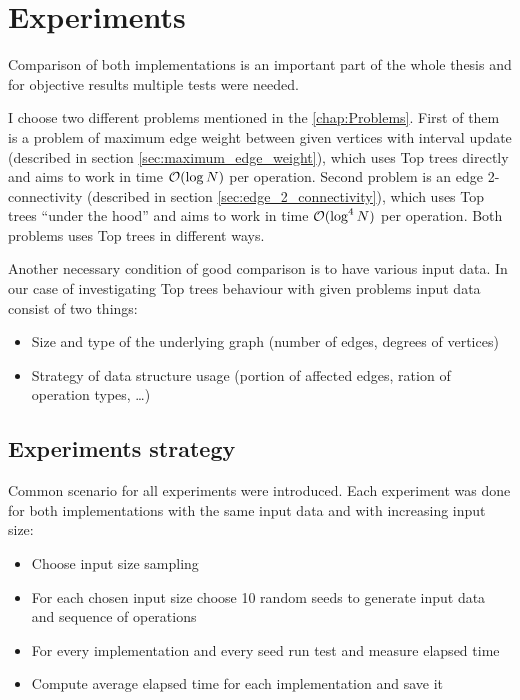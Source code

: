 \chapter{Experiments}
\label{chap:Experiments}

Comparison of both implementations is an important part of the whole thesis
and for objective results multiple tests were needed.

I choose two different problems mentioned in the \cref{chap:Problems}.
First of them is a problem of maximum edge weight between given vertices with
interval update (described in section \ref{sec:maximum_edge_weight}), which uses
Top trees directly and aims to work in time ${\cal O}(\log N)$ per operation. Second
problem is an edge 2-connectivity (described in section \ref{sec:edge_2_connectivity}),
which uses Top trees ``under the hood'' and aims to work in time ${\cal O}(\log^4 N)$
per operation. Both problems uses Top trees in different ways.

Another necessary condition of good comparison is to have various input data. In
our case of investigating Top trees behaviour with given problems input data
consist of two things:
\begin{itemize}
\item Size and type of the underlying graph (number of edges, degrees of vertices)
\item Strategy of data structure usage (portion of affected edges, ration of
operation types, \dots)
\end{itemize}

\section{Experiments strategy}

Common scenario for all experiments were introduced. Each experiment was done
for both implementations with the same input data and with increasing input
size:

\begin{itemize}
\item Choose input size sampling
\item For each chosen input size choose 10 random seeds to generate input data
and sequence of operations
\item For every implementation and every seed run test and measure elapsed time
\item Compute average elapsed time for each implementation and save it
\end{itemize}

